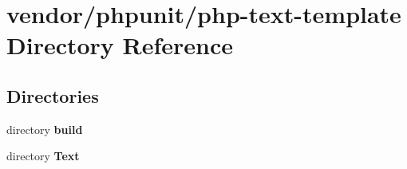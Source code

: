 \section{vendor/phpunit/php-\/text-\/template Directory Reference}
\label{dir_48471eb2f4c5e2aa6a2dc4e89bab1d9e}
\subsection*{Directories}
\begin{DoxyCompactItemize}
\item 
directory {\bf build}
\item 
directory {\bf Text}
\end{DoxyCompactItemize}
